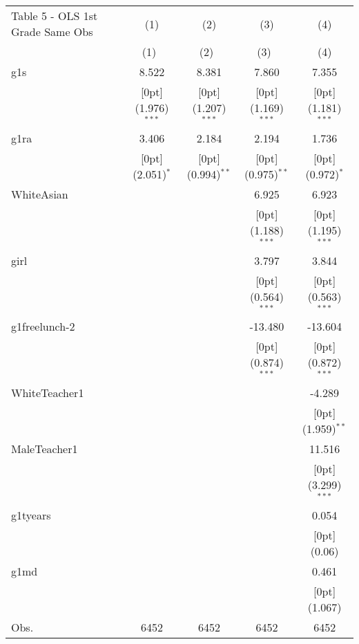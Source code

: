 \documentclass[a4paper,11pt]{article}
\begin{document}
\begin{table}
\small
\begin{tabular*}{\textwidth}{@{\extracolsep{\fill}}lcccc}				
Table 5 - OLS 1st Grade	Same Obs & \multicolumn{1}{c}{(1)} &	\multicolumn{1}{c}{(2)} &	\multicolumn{1}{c}{(3)} &	\multicolumn{1}{c}{(4)} \\
	\cline{2-5}				
	& \multicolumn{1}{c}{(1)\mbox{\ }} &	\multicolumn{1}{c}{(2)\mbox{\ }} &	\multicolumn{1}{c}{(3)\mbox{\ }} &	\multicolumn{1}{c}{(4)} \\
	\hline				
	g1s &	8.522 &	8.381 &	7.860 &	7.355 \\
	&	\raisebox{.7ex}[0pt]{\scriptsize (1.976)$^{***}$} &	\raisebox{.7ex}[0pt]{\scriptsize (1.207)$^{***}$} &	\raisebox{.7ex}[0pt]{\scriptsize (1.169)$^{***}$} &	\raisebox{.7ex}[0pt]{\scriptsize (1.181)$^{***}$} \\
	g1ra &	3.406 &	2.184 &	2.194 &	1.736 \\
	&	\raisebox{.7ex}[0pt]{\scriptsize (2.051)$^{*}$} &	\raisebox{.7ex}[0pt]{\scriptsize (0.994)$^{**}$} &	\raisebox{.7ex}[0pt]{\scriptsize (0.975)$^{**}$} &	\raisebox{.7ex}[0pt]{\scriptsize (0.972)$^{*}$} \\
	WhiteAsian &	&	&	6.925 &	6.923 \\
	&	&	&	\raisebox{.7ex}[0pt]{\scriptsize (1.188)$^{***}$} &	\raisebox{.7ex}[0pt]{\scriptsize (1.195)$^{***}$} \\
	girl &	&	&	3.797 &	3.844 \\
	&	&	&	\raisebox{.7ex}[0pt]{\scriptsize (0.564)$^{***}$} &	\raisebox{.7ex}[0pt]{\scriptsize (0.563)$^{***}$} \\
	g1freelunch-2 &	&	&	-13.480 &	-13.604 \\
	&	&	&	\raisebox{.7ex}[0pt]{\scriptsize (0.874)$^{***}$} &	\raisebox{.7ex}[0pt]{\scriptsize (0.872)$^{***}$} \\
	WhiteTeacher1 &	&	&	&	-4.289 \\
	&	&	&	&	\raisebox{.7ex}[0pt]{\scriptsize (1.959)$^{**}$} \\
	MaleTeacher1 &	&	&	&	11.516 \\
	&	&	&	&	\raisebox{.7ex}[0pt]{\scriptsize (3.299)$^{***}$} \\
	g1tyears &	&	&	&	0.054 \\
	&	&	&	&	\raisebox{.7ex}[0pt]{\scriptsize (0.06)} \\
	g1md &	&	&	&	0.461 \\
	&	&	&	&	\raisebox{.7ex}[0pt]{\scriptsize (1.067)} \\
	Obs. &	6452 &	6452 &	6452 &	6452 \\
	\hline\hline				
\end{tabular*}

\end{table}			
\end{document}
